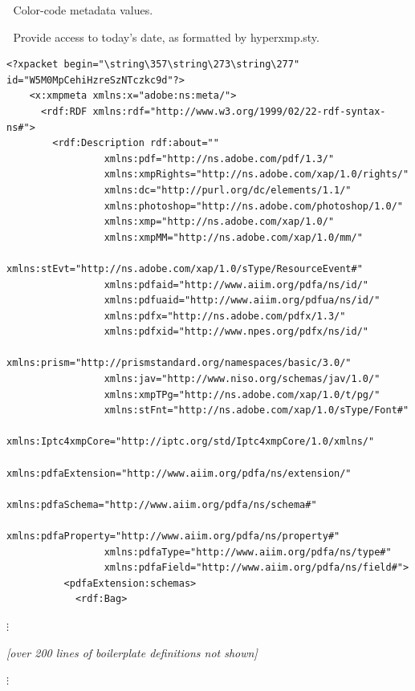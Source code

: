 ^^A  Color-code metadata values.
\newcommand{\metavalue}[1]{\textcolor{blue}{#1}}

^^A  Provide access to today's date, as formatted by hyperxmp.sty.
\makeatletter
\let\todayISO=\hyxmp@today
\makeatother

\begin{Verbatim}[fontsize=\small,commandchars=\\\{\}]
    <?xpacket begin="\string\357\string\273\string\277" id="W5M0MpCehiHzreSzNTczkc9d"?>
    <x:xmpmeta xmlns:x="adobe:ns:meta/">
      <rdf:RDF xmlns:rdf="http://www.w3.org/1999/02/22-rdf-syntax-ns#">
        <rdf:Description rdf:about=""
                 xmlns:pdf="http://ns.adobe.com/pdf/1.3/"
                 xmlns:xmpRights="http://ns.adobe.com/xap/1.0/rights/"
                 xmlns:dc="http://purl.org/dc/elements/1.1/"
                 xmlns:photoshop="http://ns.adobe.com/photoshop/1.0/"
                 xmlns:xmp="http://ns.adobe.com/xap/1.0/"
                 xmlns:xmpMM="http://ns.adobe.com/xap/1.0/mm/"
                 xmlns:stEvt="http://ns.adobe.com/xap/1.0/sType/ResourceEvent#"
                 xmlns:pdfaid="http://www.aiim.org/pdfa/ns/id/"
                 xmlns:pdfuaid="http://www.aiim.org/pdfua/ns/id/"
                 xmlns:pdfx="http://ns.adobe.com/pdfx/1.3/"
                 xmlns:pdfxid="http://www.npes.org/pdfx/ns/id/"
                 xmlns:prism="http://prismstandard.org/namespaces/basic/3.0/"
                 xmlns:jav="http://www.niso.org/schemas/jav/1.0/"
                 xmlns:xmpTPg="http://ns.adobe.com/xap/1.0/t/pg/"
                 xmlns:stFnt="http://ns.adobe.com/xap/1.0/sType/Font#"
                 xmlns:Iptc4xmpCore="http://iptc.org/std/Iptc4xmpCore/1.0/xmlns/"
                 xmlns:pdfaExtension="http://www.aiim.org/pdfa/ns/extension/"
                 xmlns:pdfaSchema="http://www.aiim.org/pdfa/ns/schema#"
                 xmlns:pdfaProperty="http://www.aiim.org/pdfa/ns/property#"
                 xmlns:pdfaType="http://www.aiim.org/pdfa/ns/type#"
                 xmlns:pdfaField="http://www.aiim.org/pdfa/ns/field#">
          <pdfaExtension:schemas>
            <rdf:Bag>
\end{Verbatim}
\begin{center}
  $\vdots$\par
  \emph{[over 200 lines of boilerplate definitions not shown]}\par
  $\vdots$\par
\end{center}
